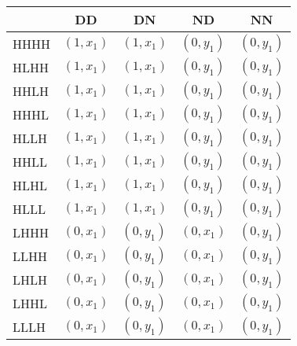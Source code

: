 \begin{tabular}{lrrrr}
\toprule
      & \multicolumn{1}{c}{DD} & \multicolumn{1}{c}{DN} & \multicolumn{1}{c}{ND} & \multicolumn{1}{c}{NN} \\
\midrule
HHHH  & \multicolumn{1}{l}{$( 1 , x_1 )$} & \multicolumn{1}{l}{$( 1 , x_1 )$} & \multicolumn{1}{l}{$( 0 , y_1 )$} & \multicolumn{1}{l}{$( 0 , y_1 )$} \\
HLHH  & \multicolumn{1}{l}{$( 1 , x_1 )$} & \multicolumn{1}{l}{$( 1 , x_1 )$} & \multicolumn{1}{l}{$( 0 , y_1 )$} & \multicolumn{1}{l}{$( 0 , y_1 )$} \\
HHLH  & \multicolumn{1}{l}{$( 1 , x_1 )$} & \multicolumn{1}{l}{$( 1 , x_1 )$} & \multicolumn{1}{l}{$( 0 , y_1 )$} & \multicolumn{1}{l}{$( 0 , y_1 )$} \\
HHHL  & \multicolumn{1}{l}{$( 1 , x_1 )$} & \multicolumn{1}{l}{$( 1 , x_1 )$} & \multicolumn{1}{l}{$( 0 , y_1 )$} & \multicolumn{1}{l}{$( 0 , y_1 )$} \\
HLLH  & \multicolumn{1}{l}{$( 1 , x_1 )$} & \multicolumn{1}{l}{$( 1 , x_1 )$} & \multicolumn{1}{l}{$( 0 , y_1 )$} & \multicolumn{1}{l}{$( 0 , y_1 )$} \\
HHLL  & \multicolumn{1}{l}{$( 1 , x_1 )$} & \multicolumn{1}{l}{$( 1 , x_1 )$} & \multicolumn{1}{l}{$( 0 , y_1 )$} & \multicolumn{1}{l}{$( 0 , y_1 )$} \\
HLHL  & \multicolumn{1}{l}{$( 1 , x_1 )$} & \multicolumn{1}{l}{$( 1 , x_1 )$} & \multicolumn{1}{l}{$( 0 , y_1 )$} & \multicolumn{1}{l}{$( 0 , y_1 )$} \\
HLLL  & \multicolumn{1}{l}{$( 1 , x_1 )$} & \multicolumn{1}{l}{$( 1 , x_1 )$} & \multicolumn{1}{l}{$( 0 , y_1 )$} & \multicolumn{1}{l}{$( 0 , y_1 )$} \\
LHHH  & \multicolumn{1}{l}{$( 0 , x_1 )$} & \multicolumn{1}{l}{$( 0 , y_1 )$} & \multicolumn{1}{l}{$( 0 , x_1 )$} & \multicolumn{1}{l}{$( 0 , y_1 )$} \\
LLHH  & \multicolumn{1}{l}{$( 0 , x_1 )$} & \multicolumn{1}{l}{$( 0 , y_1 )$} & \multicolumn{1}{l}{$( 0 , x_1 )$} & \multicolumn{1}{l}{$( 0 , y_1 )$} \\
LHLH  & \multicolumn{1}{l}{$( 0 , x_1 )$} & \multicolumn{1}{l}{$( 0 , y_1 )$} & \multicolumn{1}{l}{$( 0 , x_1 )$} & \multicolumn{1}{l}{$( 0 , y_1 )$} \\
LHHL  & \multicolumn{1}{l}{$( 0 , x_1 )$} & \multicolumn{1}{l}{$( 0 , y_1 )$} & \multicolumn{1}{l}{$( 0 , x_1 )$} & \multicolumn{1}{l}{$( 0 , y_1 )$} \\
LLLH  & \multicolumn{1}{l}{$( 0 , x_1 )$} & \multicolumn{1}{l}{$( 0 , y_1 )$} & \multicolumn{1}{l}{$( 0 , x_1 )$} & \multicolumn{1}{l}{$( 0 , y_1 )$} \\

\end{tabular}
